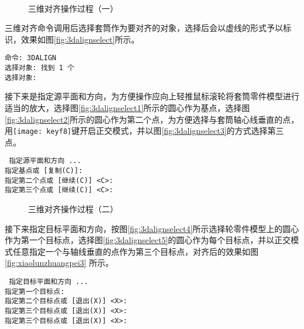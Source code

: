 \begin{procedure}
\begin{figure}[htbp]
\centering
{}\hspace{20pt}
\\
\hspace{20pt}
\caption{三维对齐操作过程（一）}
\end{figure}

三维对齐命令调用后选择套筒作为要对齐的对象，选择后会以虚线的形式予以标识，效果如图\ref{fig:3dalignselect}所示。
\begin{lstlisting}
命令: 3DALIGN
选择对象: 找到 1 个
选择对象:
\end{lstlisting}

接下来是指定源平面和方向，为方便操作应向上轻推鼠标滚轮将套筒零件模型进行适当的放大，选择图\ref{fig:3dalignselect1}所示的圆心作为基点，选择图\ref{fig:3dalignselect2}所示的圆心作为第二个点，为方便选择与套筒轴心线垂直的点，用\texttt{[image: keyf8]}键开启正交模式，并以图\ref{fig:3dalignselect3}的方式选择第三点。
\begin{lstlisting}
 指定源平面和方向 ...
指定基点或 [复制(C)]:
指定第二个点或 [继续(C)] <C>:
指定第三个点或 [继续(C)] <C>:
\end{lstlisting}

\begin{figure}[htbp]
\centering
{}\hspace{20pt}
\hspace{20pt}
\caption{三维对齐操作过程（二）}
\end{figure}

接下来指定目标平面和方向，按图\ref{fig:3dalignselect4}所示选择轮零件模型上的圆心作为第一个目标点，选择图\ref{fig:3dalignselect5}的圆心作为每个目标点，并以正交模式任意指定一个与轴线垂直的点作为第三个目标点，对齐后的效果如图\ref{fig:xiaolunzhuangpei3} 所示。
\begin{lstlisting}
 指定目标平面和方向 ...
指定第一个目标点:
指定第二个目标点或 [退出(X)] <X>:
指定第三个目标点或 [退出(X)] <X>:
指定第三个目标点或 [退出(X)] <X>:
\end{lstlisting}


\end{procedure}
